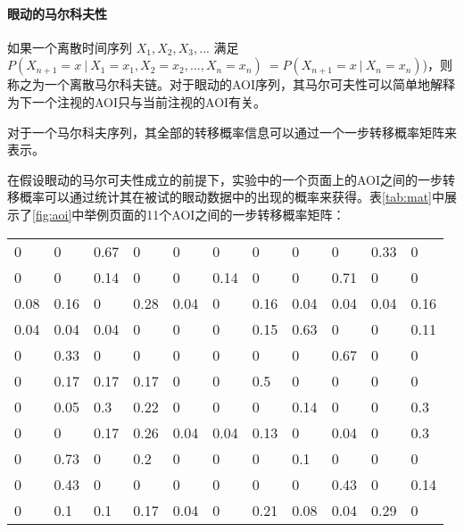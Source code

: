 \paragraph{眼动的马尔科夫性}
如果一个离散时间序列 $X_1,X_2,X_3,...$ 满足$P(X_{n+1}=x~|~X_1=x_1,X_2=x_2,...,X_n=x_n)~=P(X_{n+1}=x~|~X_n=x_n)$)，则称之为一个离散马尔科夫链。对于眼动的AOI序列，其马尔可夫性可以简单地解释为下一个注视的AOI只与当前注视的AOI有关。

对于一个马尔科夫序列，其全部的转移概率信息可以通过一个一步转移概率矩阵来表示。

在假设眼动的马尔可夫性成立的前提下，实验中的一个页面上的AOI之间的一步转移概率可以通过统计其在被试的眼动数据中的出现的概率来获得。表\ref{tab:mat}中展示了\ref{fig:aoi}中举例页面的11个AOI之间的一步转移概率矩阵：

\begin{table}[H]
\centering
  \begin{tabular}{@{}lllllllllll@{}}
  \hline
  0    & 0    & 0.67 & 0    & 0    & 0    & 0    & 0    & 0    & 0.33 & 0    \\
  0    & 0    & 0.14 & 0    & 0    & 0.14 & 0    & 0    & 0.71 & 0    & 0    \\
  0.08 & 0.16 & 0    & 0.28 & 0.04 & 0    & 0.16 & 0.04 & 0.04 & 0.04 & 0.16 \\
  0.04 & 0.04 & 0.04 & 0    & 0    & 0    & 0.15 & 0.63 & 0    & 0    & 0.11 \\
  0    & 0.33 & 0    & 0    & 0    & 0    & 0    & 0    & 0.67 & 0    & 0    \\
  0    & 0.17 & 0.17 & 0.17 & 0    & 0    & 0.5  & 0    & 0    & 0    & 0    \\
  0    & 0.05 & 0.3  & 0.22 & 0    & 0    & 0    & 0.14 & 0    & 0    & 0.3  \\
  0    & 0    & 0.17 & 0.26 & 0.04 & 0.04 & 0.13 & 0    & 0.04 & 0    & 0.3  \\
  0    & 0.73 & 0    & 0.2  & 0    & 0    & 0    & 0.1  & 0    & 0    & 0    \\
  0    & 0.43 & 0    & 0    & 0    & 0    & 0    & 0    & 0.43 & 0    & 0.14 \\
  0    & 0.1  & 0.1  & 0.17 & 0.04 & 0    & 0.21 & 0.08 & 0.04 & 0.29 & 0\\
  \hline
  \end{tabular}
\end{table}

